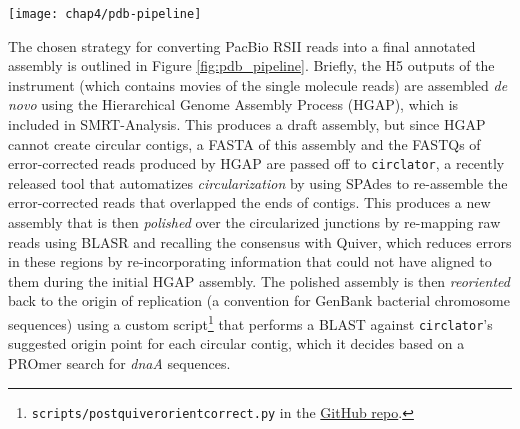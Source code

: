\begin{figure*}[hb]
  \texttt{[image: chap4/pdb-pipeline]}               
  \caption[Outline of steps automated by \pathogendbpipeline]{\textbf{Outline of steps automated by \pathogendbpipeline.} Processes are depicted as boxes, with processes requiring potentially multiple runs indicated as a ``stack.'' An interim file format is depicted as a single arrow, and groups of files as doubled arrows. The pipeline concludes with deposition of a link to an IGB Quickload Directory for the completed assembly into PathogenDB.}
  \label{fig:pdb_pipeline}
\end{figure*}

The chosen strategy for converting PacBio RSII reads into a final annotated assembly is outlined in Figure \ref{fig:pdb_pipeline}. Briefly, the H5 outputs of the instrument (which contains movies of the single molecule reads) are assembled \emph{de novo} using the Hierarchical Genome Assembly Process\autocite{Chin2013} (HGAP), which is included in SMRT-Analysis. This produces a draft assembly, but since HGAP cannot create circular contigs, a FASTA of this assembly and the FASTQs of error-corrected reads produced by HGAP are passed off to \texttt{circlator},\autocite{Hunt2015} a recently released tool that automatizes \emph{circularization} by using SPAdes\autocite{Bankevich2012} to re-assemble the error-corrected reads that overlapped the ends of contigs. This produces a new assembly that is then \emph{polished} over the circularized junctions by re-mapping raw reads using BLASR\autocite{Chaisson2012} and recalling the consensus with Quiver,\autocite{Chin2013} which reduces errors in these regions by re-incorporating information that could not have aligned to them during the initial HGAP assembly. The polished assembly is then \emph{reoriented} back to the origin of replication (a convention for GenBank bacterial chromosome sequences) using a custom script\footnote{ \texttt{scripts/post\textunderscore quiver\textunderscore orient\textunderscore correct.py} in the \href{https://github.com/powerpak/pathogendb-pipeline/blob/master/scripts/post\textunderscore quiver\textunderscore orient\textunderscore correct.py}{GitHub repo}.} that performs a BLAST against \texttt{circlator}'s suggested origin point for each circular contig, which it decides based on a PROmer\autocite{Kurtz2004} search for \emph{dnaA} sequences.

